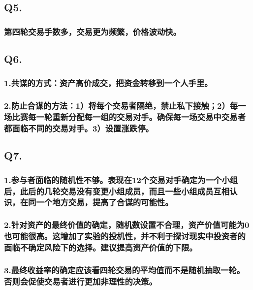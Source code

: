 \documentclass[]{article}
\begin{document}
\subsection{Q5.}\label{q5.}

\subsubsection{第四轮交易手数多，交易更为频繁，价格波动快。}

\subsection{Q6.}\label{q6.}

\subsubsection{1.共谋的方式：资产高价成交，把资金转移到一个人手里。}

\subsubsection{2.防止合谋的方法：1）将每个交易者隔绝，禁止私下接触；2）每一场比赛每一轮重新分配每一组的交易对手。确保每一场交易中交易者都面临不同的交易对手。3）设置涨跌停。}\label{123}

\subsection{Q7.}\label{q7.}

\subsubsection{1.参与者面临的随机性不够。表现在12个交易对手确定为一个小组后，此后的几轮交易没有变更小组成员，而且一些小组成员互相认识，在同一个地方交易，提高了合谋的可能性。}\label{12}

\subsubsection{2.针对资产的最终价值的确定，随机数设置不合理，资产价值可能为0也可能很高。这增加了实验的投机性，并不利于探讨现实中投资者的面临不确定风险下的选择。建议提高资产价值的下限。}\label{0}

\subsubsection{3.最终收益率的确定应该看四轮交易的平均值而不是随机抽取一轮。否则会促使交易者进行更加非理性的决策。}
\end{document}
